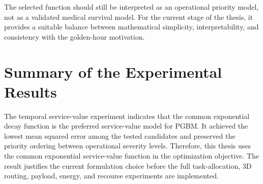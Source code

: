 The selected function should still be interpreted as an operational priority
model, not as a validated medical survival model. For the current stage of the
thesis, it provides a suitable balance between mathematical simplicity,
interpretability, and consistency with the golden-hour motivation.

\section{Summary of the Experimental Results}
\label{experimentsummary}

The temporal service-value experiment indicates that the common exponential
decay function is the preferred service-value model for PGBM. It achieved the
lowest mean squared error among the tested candidates and preserved the
priority ordering between operational severity levels. Therefore, this thesis
uses the common exponential service-value function in the optimization
objective. The result justifies the current formulation choice before the full
task-allocation, 3D routing, payload, energy, and recourse experiments are
implemented.
